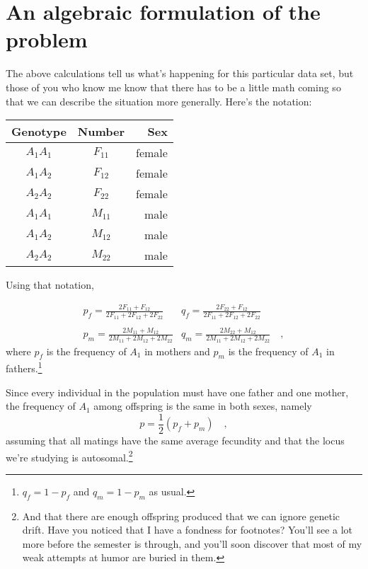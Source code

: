 \section*{An algebraic formulation of the problem}

The above calculations tell us what's happening for this particular
data set, but those of you who know me know that there has to be a
little math coming so that we can describe the situation more
generally. Here's the notation:

\begin{center}
\begin{tabular}{ccr}
\hline\hline
Genotype & Number & Sex \\
\hline
$A_1A_1$ & $F_{11}$ & female \\
$A_1A_2$ & $F_{12}$ & female \\
$A_2A_2$ & $F_{22}$ & female \\
$A_1A_1$ & $M_{11}$ & male \\
$A_1A_2$ & $M_{12}$ & male \\
$A_2A_2$ & $M_{22}$ & male \\
\hline
\end{tabular}
\end{center}

\noindent Using that notation, 

$$\begin{array}{cc}
p_f = \frac{2F_{11}+F_{12}}{2F_{11}+2F_{12}+2F_{22}} &
q_f = \frac{2F_{22}+F_{12}}{2F_{11}+2F_{12}+2F_{22}} \\
 & \\
p_m = \frac{2M_{11}+M_{12}}{2M_{11}+2M_{12}+2M_{22}} &
q_m = \frac{2M_{22}+M_{12}}{2M_{11}+2M_{12}+2M_{22}} \quad ,
\end{array}$$
where $p_f$ is the frequency of $A_1$ in mothers and $p_m$ is the
frequency of $A_1$ in fathers.\footnote{$q_f = 1 - p_f$ and $q_m = 1 -
  p_m$ as usual.}

Since every individual in the population must have one father and one
mother, the frequency of $A_1$ among offspring is the same in both
sexes, namely
\[
p = \frac{1}{2}(p_f + p_m) \quad ,
\]
assuming that all matings have the same average fecundity and that the
locus we're studying is autosomal.\footnote{And that there are enough
  offspring produced that we can ignore genetic drift. Have you
  noticed that I have a fondness for footnotes? You'll see a lot more
  before the semester is through, and you'll soon discover that most
  of my weak attempts at humor are buried in them.}

